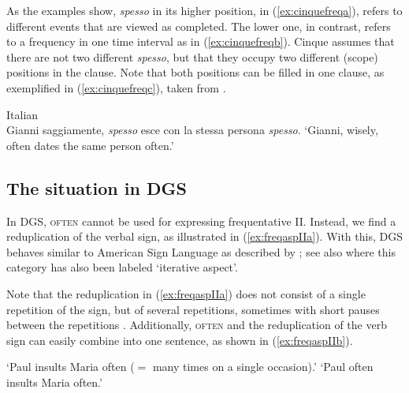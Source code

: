 \noindent As the examples show, \textit{spesso} in its higher position, in (\ref{ex:cinquefreqa}), refers to different events that are viewed as completed. The lower one, in contrast, refers to a frequency in one time interval as in (\ref{ex:cinquefreqb}). Cinque assumes that there are not two different \textit{spesso}, but that they occupy two different (scope) positions in the clause. Note that both positions can be filled in one clause, as exemplified in (\ref{ex:cinquefreqc}), taken from \citet[92]{cinque1999adverbs}.

\begin{exe}

\ex Italian \citep[92]{cinque1999adverbs} \\ {Gianni saggiamente, \textit{spesso} esce con la stessa persona \textit{spesso}.} 
\glt `Gianni, wisely, often dates the same person often.' \label{ex:cinquefreqc}

\end{exe} 


\subsection{The situation in DGS}
\noindent In DGS, \textsc{often} cannot be used for expressing frequentative II. Instead, we find a reduplication of the verbal sign, as illustrated in (\ref{ex:freqaspIIa}). With this, DGS behaves similar to American Sign Language as described by \citet{klima1979signs,rathmann2005event}; see also \citet{pfausteinbwol2012tense} where this category has also been labeled `iterative aspect'.

Note that the reduplication in (\ref{ex:freqaspIIa}) does not consist of a single repetition of the sign, but of several repetitions, sometimes with short pauses between the repetitions \citep[163]{papaspyrou2008grammatik}. Additionally, \textsc{often} and the reduplication of the verb sign can easily combine into one sentence, as shown in (\ref{ex:freqaspIIb}).


\begin{exe}
\ex\label{frequecsaca}\begin{xlist} 
\glt `Paul insults Maria often ($=$ many times on a single occasion).' \label{ex:freqaspIIa}
\glt `Paul often insults Maria often.' \label{ex:freqaspIIb}
\end{xlist}
\end{exe} 

